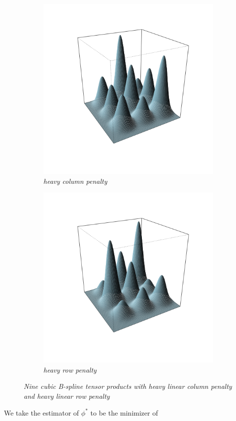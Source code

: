 \documentclass[12pt]{article}
\theoremstyle{definition}
\begin{document}
\begin{figure}[H] \label{fig:2d_PS_penalty_demo}
 \begin{subfigure}{.48\textwidth}
  \centering
   \graphicspath{{img/}}
 \includegraphics[scale=0.5]{"model selection/effective dimension/2d_PS_section_figure1_big_col_lambda"}
 \caption{\textit{heavy column penalty}}
 \label{fig:2D_PS_big_col_penalty}
 \end{subfigure}
 \begin{subfigure}{.48\textwidth}
  \centering
   \graphicspath{{img/}}
  \includegraphics[scale=0.5]{"model selection/effective dimension/2d_PS_section_figure1_big_row_lambda"}
 \caption{\textit{heavy row penalty}}
\label{fig:2D_PS_big_row_penalty}
 \end{subfigure}
 \caption{\textit{Nine cubic B-spline tensor products with heavy linear column penalty and heavy linear row penalty}}
\end{figure}
\noindent
We take the estimator of $\phi^*$ to be the minimizer of 
\end{document}
